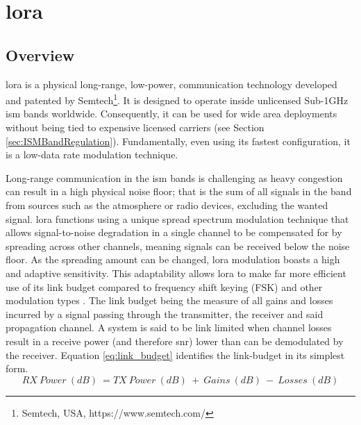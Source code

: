 \section{\ac{lora}}
\label{sec:lora}
\subsection{Overview}
\ac{lora} is a physical long-range, low-power, communication technology developed and patented by Semtech\footnote{Semtech, USA, https://www.semtech.com/}. It is designed to operate inside unlicensed Sub-1GHz \ac{ism} bands worldwide. Consequently, it can be used for wide area deployments without being tied to expensive licensed carriers  (see Section \ref{sec:ISMBandRegulation}). Fundamentally, even using its fastest configuration, it is a low-data rate modulation technique.

Long-range communication in the \ac{ism} bands is challenging as heavy congestion can result in a high physical noise floor; that is the sum of all signals in the band from sources such as the atmosphere or radio devices, excluding the wanted signal. \ac{lora} functions using a unique spread spectrum modulation technique that allows signal-to-noise degradation in a single channel to be compensated for by spreading across other channels, meaning signals can be received below the noise floor. As the spreading amount can be changed, \ac{lora} modulation boasts a high and adaptive sensitivity. This adaptability allows \ac{lora} to make far more efficient use of its link budget compared to frequency shift keying (FSK) and other modulation types \cite{3YP:LORA_MOD_BASICS}. The link budget being the measure of all gains and losses incurred by a signal passing through the transmitter, the receiver and said propagation channel. A system is said to be link limited when channel losses result in a receive power (and therefore \ac{snr}) lower than can be demodulated by the receiver. Equation \ref{eq:link_budget} identifies the link-budget in its simplest form.
\begin{equation}
\label{eq:link_budget}
RX\ Power\ (dB)\ = TX\ Power\ (dB)\ +\ Gains\ (dB)\ -\ Losses\ (dB)
\end{equation}



